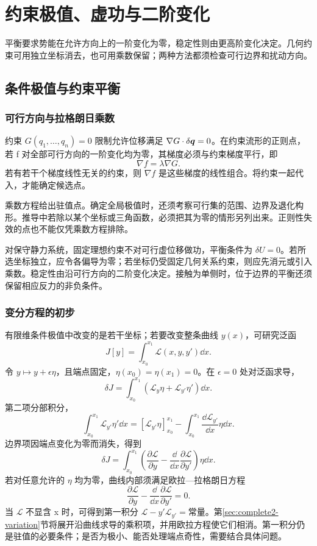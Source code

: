 \section{约束极值、虚功与二阶变化}

平衡要求势能在允许方向上的一阶变化为零，稳定性则由更高阶变化决定。几何约束可用独立坐标消去，也可用乘数保留；两种方法都须检查可行边界和扰动方向。



\subsection{条件极值与约束平衡}
\subsubsection{可行方向与拉格朗日乘数}
约束 $G(q_1,\ldots,q_n)=0$ 限制允许位移满足 $\nabla G\cdot\delta\bm{q}=0$。在约束流形的正则点，若 f 对全部可行方向的一阶变化均为零，其梯度必须与约束梯度平行，即
\[
\nabla f=\lambda\nabla G.
\]
若有若干个梯度线性无关的约束，则 $\nabla f$ 是这些梯度的线性组合。将约束一起代入，才能确定候选点。

乘数方程给出驻值点。确定全局极值时，还须考察可行集的范围、边界及退化构形。推导中若除以某个坐标或三角函数，必须把其为零的情形另列出来。正则性失效的点也不能仅凭乘数方程排除。

对保守静力系统，固定理想约束不对可行虚位移做功，平衡条件为 $\delta U=0$。若所选坐标独立，应令各偏导为零；若坐标仍受固定几何关系约束，则应先消元或引入乘数。稳定性由沿可行方向的二阶变化决定。接触为单侧时，位于边界的平衡还须保留相应反力的非负条件。

\subsubsection{变分方程的初步}
有限维条件极值中改变的是若干坐标；若要改变整条曲线 $y(x)$，可研究泛函
\[
J[y]=\int_{x_0}^{x_1}\mathcal L(x,y,y')\dd x.
\]
令 $y\mapsto y+\epsilon\eta$，且端点固定，$\eta(x_0)=\eta(x_1)=0$。在 $\epsilon=0$ 处对泛函求导，
\[
\delta J=\int_{x_0}^{x_1}(\mathcal L_y\eta+\mathcal L_{y'}\eta')\dd x.
\]
第二项分部积分，
\[
\int_{x_0}^{x_1}\mathcal L_{y'}\eta'\dd x
=[\mathcal L_{y'}\eta]_{x_0}^{x_1}
-\int_{x_0}^{x_1}\frac{\dd\mathcal L_{y'}}{\dd x}\eta\dd x.
\]
边界项因端点变化为零而消失，得到
\[
\delta J=\int_{x_0}^{x_1}
\left(\frac{\partial\mathcal L}{\partial y}
-\frac\dd{\dd x}\frac{\partial\mathcal L}{\partial y'}\right)\eta\dd x.
\]
若对任意允许的 $\eta$ 均为零，曲线内部须满足欧拉—拉格朗日方程
\[
\frac{\partial\mathcal L}{\partial y}
-\frac\dd{\dd x}\frac{\partial\mathcal L}{\partial y'}=0.
\]
当 $\mathcal L$ 不显含 x 时，可得到第一积分 $\mathcal L-y'\mathcal L_{y'}=\text{常量}$。第\ref{sec:complete2-variation}节将展开沿曲线求导的乘积项，并用欧拉方程使它们相消。第一积分仍是驻值的必要条件；是否为极小、能否处理端点奇性，需要结合具体问题。


